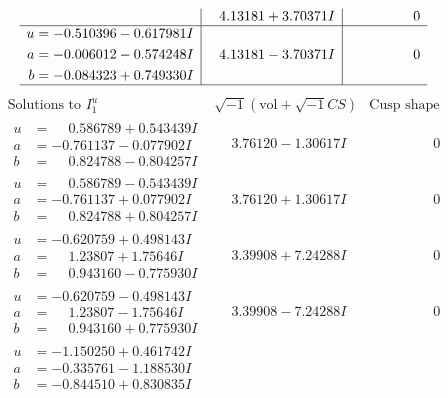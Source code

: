 \documentclass[1p]{elsarticle_modified}
\theoremstyle{definition}
\newcommand{\I}{\sqrt{-1}}
\begin{document}
$$\begin{array}{c|c|c}
 & \phantom{-}4.13181 + 3.70371 I & \phantom{-0.000000 } 0 \\ \hline\begin{aligned}
u &= -0.510396 - 0.617981 I \\
a &= -0.006012 - 0.574248 I \\
b &= -0.084323 + 0.749330 I\end{aligned}
 & \phantom{-}4.13181 - 3.70371 I & \phantom{-0.000000 } 0\\
 \hline 
 \end{array}$$\newpage$$\begin{array}{c|c|c}  
\text{Solutions to }I^u_{1}& \I (\text{vol} + \sqrt{-1}CS) & \text{Cusp shape}\\
 \hline 
\begin{aligned}
u &= \phantom{-}0.586789 + 0.543439 I \\
a &= -0.761137 - 0.077902 I \\
b &= \phantom{-}0.824788 - 0.804257 I\end{aligned}
 & \phantom{-}3.76120 - 1.30617 I & \phantom{-0.000000 } 0 \\ \hline\begin{aligned}
u &= \phantom{-}0.586789 - 0.543439 I \\
a &= -0.761137 + 0.077902 I \\
b &= \phantom{-}0.824788 + 0.804257 I\end{aligned}
 & \phantom{-}3.76120 + 1.30617 I & \phantom{-0.000000 } 0 \\ \hline\begin{aligned}
u &= -0.620759 + 0.498143 I \\
a &= \phantom{-}1.23807 + 1.75646 I \\
b &= \phantom{-}0.943160 - 0.775930 I\end{aligned}
 & \phantom{-}3.39908 + 7.24288 I & \phantom{-0.000000 } 0 \\ \hline\begin{aligned}
u &= -0.620759 - 0.498143 I \\
a &= \phantom{-}1.23807 - 1.75646 I \\
b &= \phantom{-}0.943160 + 0.775930 I\end{aligned}
 & \phantom{-}3.39908 - 7.24288 I & \phantom{-0.000000 } 0 \\ \hline\begin{aligned}
u &= -1.150250 + 0.461742 I \\
a &= -0.335761 - 1.188530 I \\
b &= -0.844510 + 0.830835 I\end{aligned}

\end{array}$$
\end{document}

